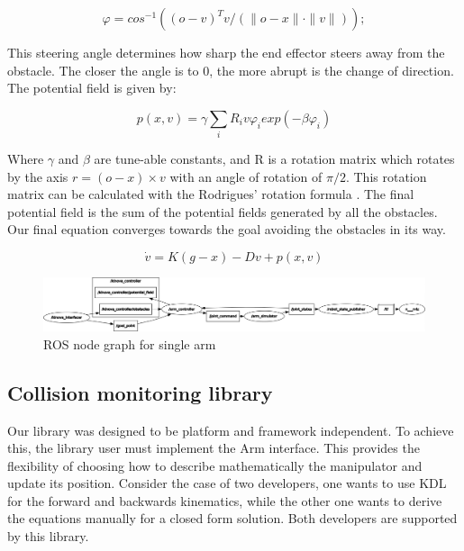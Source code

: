 \documentclass[a4paper, 10pt, conference]{ieeeconf}      %
\begin{document}
\begin{equation} \label{eq:2}
	\varphi = cos^{-1} ((o-v)^T v / (\|o-x\| \cdot \|v\|));
\end{equation}

This steering angle determines how sharp the end effector steers away from the obstacle. The closer the angle is to 0, the more abrupt is the change of direction. The potential field is given by:

\begin{equation}
	p(x, v) = \gamma \sum_i R_i v \varphi_i exp(-\beta \varphi_i) 
\end{equation}

Where $\gamma$ and $\beta$ are tune-able constants, and R is a rotation matrix which rotates by the axis $r = (o-x) \times v $ with an angle of rotation of $\pi/2$. This rotation matrix can be calculated with the Rodrigues' rotation formula \cite{rodrigues}. The final potential field is the sum of the potential fields generated by all the obstacles. Our final equation converges towards the goal avoiding the obstacles in its way.

\begin{equation}
\dot{v} = K ( g - x ) - D v + p(x, v)
\end{equation}

\begin{figure}[t]
	\centering
	\includegraphics[scale=0.25]{images/rosgraph_single.png}
	\caption{ROS node graph for single arm}
	\label{fig:rosgraph_single}
\end{figure}

\subsection{Collision monitoring library} %

Our library was designed to be platform and framework independent. To achieve this, the library user must implement the Arm interface. This provides the flexibility of choosing how to describe mathematically the manipulator and update its position. Consider the case of two developers, one wants to use KDL for the forward and backwards kinematics, while the other one wants to derive the equations manually for a closed form solution. Both developers are supported by this library. 
\end{document}
